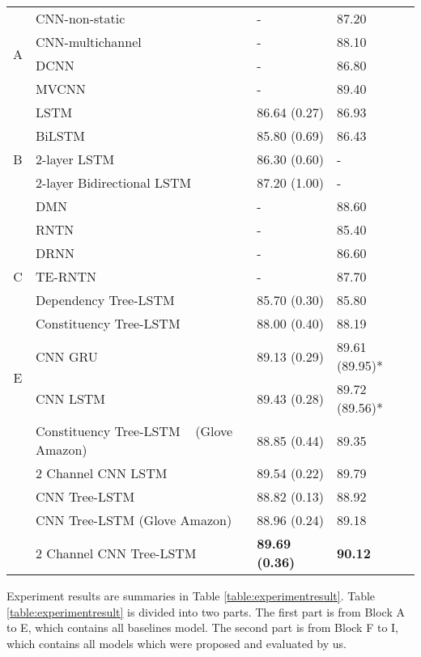 \begin{table*}[]
\begin{tabular}{c|lll}
		\multirow{4}{*}{A} & CNN-non-static~\cite{KimCNN} & - & 87.20\Tstrut \\
		& CNN-multichannel~\cite{KimCNN} & - & 88.10 \\
		& DCNN~\cite{DCNN} & - & 86.80 \\
		& MVCNN~\cite{2-layer-cnn} & - & 89.40 \\
		\hline
		\multirow{5}{*}{B} & LSTM~\cite{originLSTM}    & 86.64 (0.27) & 86.93  \\
		& BiLSTM~\cite{GravesLSTM}  & 85.80 (0.69) & 86.43   \\
		& 2-layer LSTM~\cite{GravesLSTM} & 86.30 (0.60) & - \\
		& 2-layer Bidirectional LSTM~\cite{GravesLSTM} & 87.20 (1.00) & - \\
		& DMN~\cite{attention-gru} & - & 88.60 \\
		\hline
		\multirow{5}{*}{C} & RNTN~\cite{socher2013recursive}  & - & 85.40  \\
		& DRNN~\cite{IrsoyDRNN} & - & 86.60 \\
		& TE-RNTN~\cite{tag-embedding-rnn} & - & 87.70 \\
		& Dependency Tree-LSTM  ~\cite{treeLSTM}  & 85.70 (0.30)  & 85.80 \\
		& Constituency Tree-LSTM ~\cite{treeLSTM} & 88.00 (0.40)    &   88.19\\
		\hline
		\multirow{2}{*}{E}  & CNN GRU ~\cite{cnn-rnn}                    & 89.13 (0.29)  &  89.61 (89.95)*    \\
		& CNN LSTM ~\cite{cnn-rnn}                    & 89.43 (0.28)  & 89.72 (89.56)*\Bstrut    \\
		\Xhline{3\arrayrulewidth}
		\Xhline{3\arrayrulewidth}
		 & Constituency Tree-LSTM ~\cite{treeLSTM} (Glove Amazon) & 88.85 (0.44) & 89.35\Tstrut\\
		& 2 Channel CNN LSTM                        & 89.54    (0.22) & 89.79    \\
		 & CNN Tree-LSTM                            & 88.82 (0.13) & 88.92 \\
		& CNN Tree-LSTM (Glove Amazon)             & 88.96 (0.24) & 89.18 \\
		& 2 Channel CNN Tree-LSTM  &\textbf{89.69 (0.36)} & \textbf{90.12}    \\
	\end{tabular}
\end{table*}
Experiment results are summaries in Table \ref{table:experimentresult}.
Table \ref{table:experimentresult} is divided into two parts.
The first part is from Block A to E, which contains all baselines model.
The second part is from Block F to I, which contains all models which were proposed and evaluated by us.

